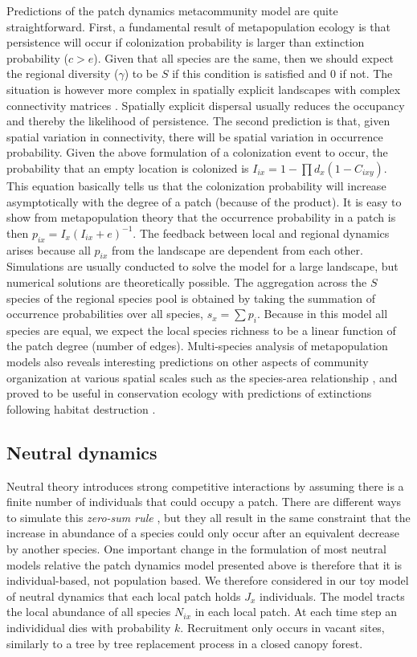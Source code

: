 \documentclass[12pt]{article}
\begin{document}
Predictions of the patch dynamics metacommunity model are quite straightforward.
First, a fundamental result of metapopulation ecology is that persistence will
occur if colonization probability is larger than extinction probability ($c>e$).
Given that all species are the same, then we should expect the regional
diversity ($\gamma$) to be $S$ if this condition is satisfied and $0$ if not.
The situation is however more complex in spatially explicit landscapes with
complex connectivity matrices \parencite{Hanski1998}. Spatially explicit
dispersal usually reduces the occupancy and thereby the likelihood of
persistence. The second prediction is that, given spatial variation in
connectivity, there will be spatial variation in occurrence probability. Given
the above formulation of a colonization event to occur, the probability that an
empty location is colonized is $I_{ix}=1-\prod d_x(1-C_{ixy})$. This equation
basically tells us that the colonization probability will increase
asymptotically with the degree of a patch (because of the product). It is easy
to show from metapopulation theory that the occurrence probability in a patch is
then $p_{ix}=I_x(I_{ix}+e)^{-1}$. The feedback between local and regional dynamics
arises because all $p_{ix}$ from the landscape are dependent from each other.
Simulations are usually conducted to solve the model for a large landscape, but
numerical solutions are theoretically possible. The aggregation across the $S$
species of the regional species pool is obtained by taking the summation of
occurrence probabilities over all species, $s_x = \sum{p_i}$. Because in this
model all species are equal, we expect the local species richness to be a linear
function of the patch degree (number of edges). Multi-species analysis of
metapopulation models also reveals interesting predictions on other aspects of
community organization at various spatial scales such as the species-area
relationship \parencite{Hanski1997}, and proved to be useful in conservation
ecology with predictions of extinctions following habitat destruction
\parencite{Tilman1994b,Rybicki2013}.

\subsection*{Neutral dynamics}

Neutral theory introduces strong competitive interactions by assuming there is a
finite number of individuals that could occupy a patch. There are different ways
to simulate this \emph{zero-sum rule} \parencite{Bell2000,Hubbell2001}, but they
all result in the same constraint that the increase in abundance of a species
could only occur after an equivalent decrease by another species. One important
change in the formulation of most neutral models relative the patch dynamics
model presented above is therefore that it is individual-based, not population
based. We therefore considered in our toy model of neutral dynamics that each
local patch holds $J_x$ individuals. The model tracts the local abundance of all
species $N_{ix}$ in each local patch. At each time step an individidual dies
with probability $k$. Recruitment only occurs in vacant sites, similarly to a
tree by tree replacement process in a closed canopy forest.
\end{document}
